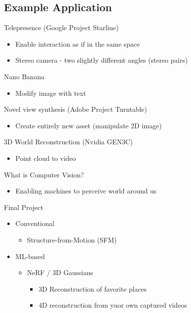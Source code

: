 \subsection{Example Application}
Telepresence (Google Project Starline)
\begin{itemize}
    \item Enable interaction as if in the same space
    \item Stereo camera - two slightly different angles (stereo pairs)
\end{itemize}
Nano Banana
\begin{itemize}
    \item Modify image with text
\end{itemize}
Novel view synthesis (Adobe Project Turntable)
\begin{itemize}
    \item Create entirely new asset (manipulate 2D image)
\end{itemize}
3D World Reconstruction (Nvidia GEN3C)
\begin{itemize}
    \item Point cloud to video
\end{itemize}
What is Computer Vision?
\begin{itemize}
    \item Enabling machines to perceive world around us
\end{itemize}
Final Project
\begin{itemize}
    \item Conventional
    \begin{itemize}
        \item Structure-from-Motion (SFM)
    \end{itemize}
    \item ML-based
    \begin{itemize}
        \item NeRF / 3D Gaussians
        \begin{itemize}
            \item 3D Reconstruction of favorite places
            \item 4D reconstruction from yuor own captured videos
        \end{itemize}
    \end{itemize}
\end{itemize}